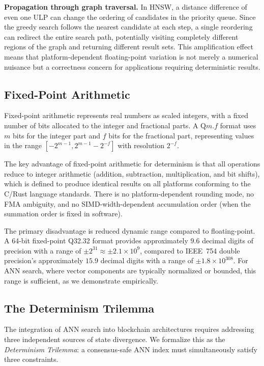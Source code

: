 \documentclass[10pt,journal,compsoc]{IEEEtran}
\newcommand{\hnsw}{\textsc{HNSW}}
\begin{document}
\textbf{Propagation through graph traversal.} In \hnsw{}, a distance difference of even one ULP can change the ordering of candidates in the priority queue. Since the greedy search follows the nearest candidate at each step, a single reordering can redirect the entire search path, potentially visiting completely different regions of the graph and returning different result sets. This amplification effect means that platform-dependent floating-point variation is not merely a numerical nuisance but a correctness concern for applications requiring deterministic results.

\subsection{Fixed-Point Arithmetic}

Fixed-point arithmetic represents real numbers as scaled integers, with a fixed number of bits allocated to the integer and fractional parts. A Q$m$.$f$ format uses $m$ bits for the integer part and $f$ bits for the fractional part, representing values in the range $[-2^{m-1}, 2^{m-1} - 2^{-f}]$ with resolution $2^{-f}$.

The key advantage of fixed-point arithmetic for determinism is that all operations reduce to integer arithmetic (addition, subtraction, multiplication, and bit shifts), which is defined to produce identical results on all platforms conforming to the C/Rust language standards. There is no platform-dependent rounding mode, no FMA ambiguity, and no SIMD-width-dependent accumulation order (when the summation order is fixed in software).

The primary disadvantage is reduced dynamic range compared to floating-point. A 64-bit fixed-point Q32.32 format provides approximately $9.6$ decimal digits of precision with a range of $\pm 2^{31} \approx \pm 2.1 \times 10^9$, compared to IEEE~754 double precision's approximately $15.9$ decimal digits with a range of $\pm 1.8 \times 10^{308}$. For ANN search, where vector components are typically normalized or bounded, this range is sufficient, as we demonstrate empirically.

\subsection{The Determinism Trilemma}
\label{sec:trilemma}

The integration of ANN search into blockchain architectures requires addressing three independent sources of state divergence. We formalize this as the \emph{Determinism Trilemma}: a consensus-safe ANN index must simultaneously satisfy three constraints.
\end{document}
